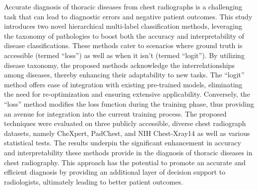 Accurate diagnosis of thoracic diseases from chest radiographs is a challenging task that can lead to diagnostic errors and negative patient outcomes.
This study introduces two novel hierarchical multi-label classification methods, leveraging the taxonomy of pathologies to boost both the accuracy and interpretability of disease classifications.
These methods cater to scenarios where ground truth is accessible (termed ``loss'') as well as when it isn't (termed ``logit'').
By utilizing disease taxonomy, the proposed methods acknowledge the interrelationships among diseases, thereby enhancing their adaptability to new tasks.
The ``logit'' method offers ease of integration with existing pre-trained models, eliminating the need for re-optimization and ensuring extensive applicability.
Conversely, the ``loss'' method modifies the loss function during the training phase, thus providing an avenue for integration into the current training process.
The proposed techniques were evaluated on three publicly accessible, diverse chest radiograph datasets, namely CheXpert, PadChest, and NIH Chest-Xray14 as well as various statistical tests.
The results underpin the significant enhancement in accuracy and interpretability these methods provide in the diagnosis of thoracic diseases in chest radiography.
This approach has the potential to promote an accurate and efficient diagnosis by providing an additional layer of decision support to radiologists, ultimately leading to better patient outcomes.







